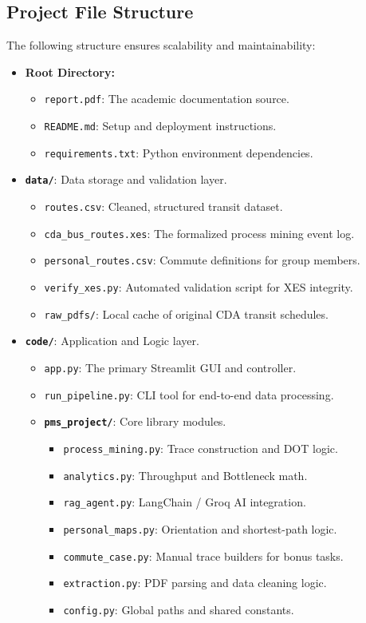 \documentclass[12pt,a4paper]{article}
\begin{document}
\subsection{Project File Structure}
The following structure ensures scalability and maintainability:
\begin{itemize}
    \item \textbf{Root Directory:}
    \begin{itemize}
        \item \texttt{report.pdf}: The academic documentation source.
        \item \texttt{README.md}: Setup and deployment instructions.
        \item \texttt{requirements.txt}: Python environment dependencies.
    \end{itemize}
    \item \textbf{\texttt{data/}}: Data storage and validation layer.
    \begin{itemize}
        \item \texttt{routes.csv}: Cleaned, structured transit dataset.
        \item \texttt{cda\_bus\_routes.xes}: The formalized process mining event log.
        \item \texttt{personal\_routes.csv}: Commute definitions for group members.
        \item \texttt{verify\_xes.py}: Automated validation script for XES integrity.
        \item \texttt{raw\_pdfs/}: Local cache of original CDA transit schedules.
    \end{itemize}
    \item \textbf{\texttt{code/}}: Application and Logic layer.
    \begin{itemize}
        \item \texttt{app.py}: The primary Streamlit GUI and controller.
        \item \texttt{run\_pipeline.py}: CLI tool for end-to-end data processing.
        \item \textbf{\texttt{pms\_project/}}: Core library modules.
        \begin{itemize}
            \item \texttt{process\_mining.py}: Trace construction and DOT logic.
            \item \texttt{analytics.py}: Throughput and Bottleneck math.
            \item \texttt{rag\_agent.py}: LangChain / Groq AI integration.
            \item \texttt{personal\_maps.py}: Orientation and shortest-path logic.
            \item \texttt{commute\_case.py}: Manual trace builders for bonus tasks.
            \item \texttt{extraction.py}: PDF parsing and data cleaning logic.
            \item \texttt{config.py}: Global paths and shared constants.
        \end{itemize}
    \end{itemize}
\end{itemize}
\end{document}
